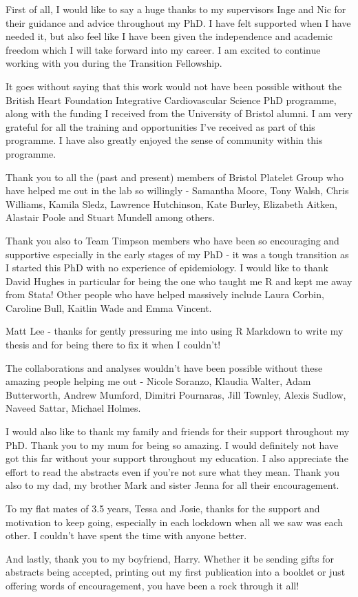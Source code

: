 \documentclass[11pt,twoside]{bristolthesis}
\begin{document}
  \begin{acknowledgements}
    First of all, I would like to say a huge thanks to my supervisors Inge and Nic for their guidance and advice throughout my PhD. I have felt supported when I have needed it, but also feel like I have been given the independence and academic freedom which I will take forward into my career. I am excited to continue working with you during the Transition Fellowship.

    It goes without saying that this work would not have been possible without the British Heart Foundation Integrative Cardiovascular Science PhD programme, along with the funding I received from the University of Bristol alumni. I am very grateful for all the training and opportunities I've received as part of this programme. I have also greatly enjoyed the sense of community within this programme.

    Thank you to all the (past and present) members of Bristol Platelet Group who have helped me out in the lab so willingly - Samantha Moore, Tony Walsh, Chris Williams, Kamila Sledz, Lawrence Hutchinson, Kate Burley, Elizabeth Aitken, Alastair Poole and Stuart Mundell among others.

    Thank you also to Team Timpson members who have been so encouraging and supportive especially in the early stages of my PhD - it was a tough transition as I started this PhD with no experience of epidemiology. I would like to thank David Hughes in particular for being the one who taught me R and kept me away from Stata! Other people who have helped massively include Laura Corbin, Caroline Bull, Kaitlin Wade and Emma Vincent.

    Matt Lee - thanks for gently pressuring me into using R Markdown to write my thesis and for being there to fix it when I couldn't!

    The collaborations and analyses wouldn't have been possible without these amazing people helping me out - Nicole Soranzo, Klaudia Walter, Adam Butterworth, Andrew Mumford, Dimitri Pournaras, Jill Townley, Alexis Sudlow, Naveed Sattar, Michael Holmes.

    I would also like to thank my family and friends for their support throughout my PhD. Thank you to my mum for being so amazing. I would definitely not have got this far without your support throughout my education. I also appreciate the effort to read the abstracts even if you're not sure what they mean. Thank you also to my dad, my brother Mark and sister Jenna for all their encouragement.

    To my flat mates of 3.5 years, Tessa and Josie, thanks for the support and motivation to keep going, especially in each lockdown when all we saw was each other. I couldn't have spent the time with anyone better.

    And lastly, thank you to my boyfriend, Harry. Whether it be sending gifts for abstracts being accepted, printing out my first publication into a booklet or just offering words of encouragement, you have been a rock through it all!
  \end{acknowledgements}
\end{document}
